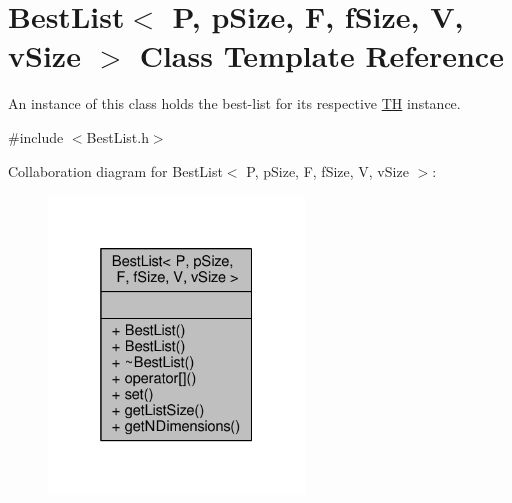\hypertarget{classBestList}{}\section{Best\+List$<$ P, p\+Size, F, f\+Size, V, v\+Size $>$ Class Template Reference}
\label{classBestList}


An instance of this class holds the best-\/list for its respective \hyperlink{classTH}{TH} instance.  




{\ttfamily \#include $<$Best\+List.\+h$>$}



Collaboration diagram for Best\+List$<$ P, p\+Size, F, f\+Size, V, v\+Size $>$\+:
\nopagebreak
\begin{figure}[H]
\begin{center}
\leavevmode
\includegraphics[width=193pt]{classBestList__coll__graph}
\end{center}
\end{figure}
